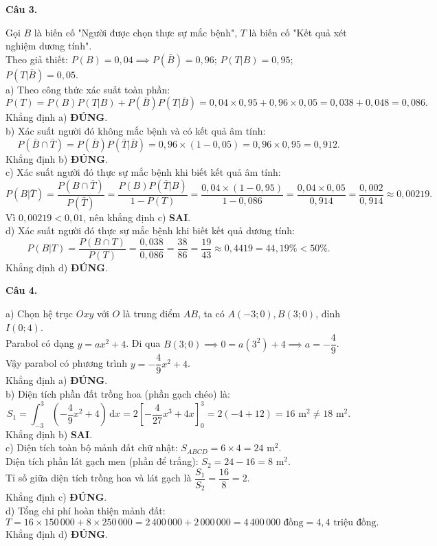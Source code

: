 \documentclass[12pt,a4paper]{article}
\newcommand{\loigiai}[1]{\par\medskip\Needspace{4\baselineskip}\noindent\textbf{#1}\par\nobreak}
\begin{document}
\loigiai{Câu 3.}
Gọi $B$ là biến cố "Người được chọn thực sự mắc bệnh", $T$ là biến cố "Kết quả xét nghiệm dương tính".\\
Theo giả thiết: $P(B) = 0{,}04 \implies P(\bar{B}) = 0{,}96$; $P(T|B) = 0{,}95$; $P(T|\bar{B}) = 0{,}05$.\\
a) Theo công thức xác suất toàn phần:
$$P(T) = P(B)P(T|B) + P(\bar{B})P(T|\bar{B}) = 0{,}04 \times 0{,}95 + 0{,}96 \times 0{,}05 = 0{,}038 + 0{,}048 = 0{,}086.$$
Khẳng định a) \textbf{ĐÚNG}.\\
b) Xác suất người đó không mắc bệnh và có kết quả âm tính:
$$P(\bar{B} \cap \bar{T}) = P(\bar{B})P(\bar{T}|\bar{B}) = 0{,}96 \times (1 - 0{,}05) = 0{,}96 \times 0{,}95 = 0{,}912.$$
Khẳng định b) \textbf{ĐÚNG}.\\
c) Xác suất người đó thực sự mắc bệnh khi biết kết quả âm tính:
$$P(B|\bar{T}) = \dfrac{P(B \cap \bar{T})}{P(\bar{T})} = \dfrac{P(B)P(\bar{T}|B)}{1 - P(T)} = \dfrac{0{,}04 \times (1 - 0{,}95)}{1 - 0{,}086} = \dfrac{0{,}04 \times 0{,}05}{0{,}914} = \dfrac{0{,}002}{0{,}914} \approx 0{,}00219.$$
Vì $0{,}00219 < 0{,}01$, nên khẳng định c) \textbf{SAI}.\\
d) Xác suất người đó thực sự mắc bệnh khi biết kết quả dương tính:
$$P(B|T) = \dfrac{P(B \cap T)}{P(T)} = \dfrac{0{,}038}{0{,}086} = \dfrac{38}{86} = \dfrac{19}{43} \approx 0{,}4419 = 44{,}19\% < 50\%.$$
Khẳng định d) \textbf{ĐÚNG}.

\loigiai{Câu 4.}
a) Chọn hệ trục $Oxy$ với $O$ là trung điểm $AB$, ta có $A(-3; 0), B(3; 0)$, đỉnh $I(0; 4)$.\\
Parabol có dạng $y = ax^2 + 4$. Đi qua $B(3; 0) \implies 0 = a(3^2) + 4 \implies a = -\dfrac{4}{9}$.\\
Vậy parabol có phương trình $y = -\dfrac{4}{9}x^2 + 4$.\\
Khẳng định a) \textbf{ĐÚNG}.\\
b) Diện tích phần đất trồng hoa (phần gạch chéo) là:
$$S_1 = \int_{-3}^3 \left(-\dfrac{4}{9}x^2 + 4\right)\,\mathrm{d}x = 2 \left[-\dfrac{4}{27}x^3 + 4x\right]_0^3 = 2(-4 + 12) = 16\text{ m}^2 \ne 18\text{ m}^2.$$
Khẳng định b) \textbf{SAI}.\\
c) Diện tích toàn bộ mảnh đất chữ nhật: $S_{ABCD} = 6 \times 4 = 24\text{ m}^2$.\\
Diện tích phần lát gạch men (phần để trắng): $S_2 = 24 - 16 = 8\text{ m}^2$.\\
Tỉ số giữa diện tích trồng hoa và lát gạch là $\dfrac{S_1}{S_2} = \dfrac{16}{8} = 2$.\\
Khẳng định c) \textbf{ĐÚNG}.\\
d) Tổng chi phí hoàn thiện mảnh đất:
$$T = 16 \times 150\,000 + 8 \times 250\,000 = 2\,400\,000 + 2\,000\,000 = 4\,400\,000\text{ đồng} = 4{,}4\text{ triệu đồng}.$$
Khẳng định d) \textbf{ĐÚNG}.
\end{document}
